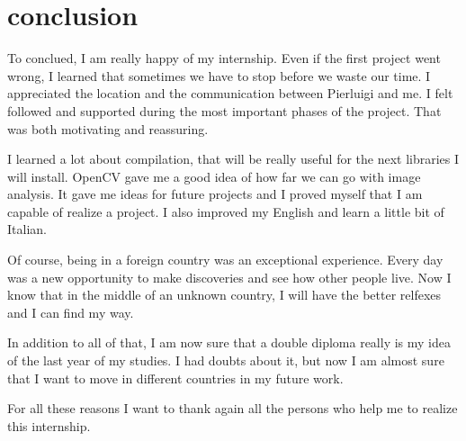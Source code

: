 \chapter{conclusion}

\par To conclued, I am really happy of my internship. Even if the first project went wrong, I learned that sometimes we have to stop before we waste our time. I appreciated the location and the communication between Pierluigi and me. I felt followed and supported during the most important phases of the project. That was both motivating and reassuring.
\par I learned a lot about compilation, that will be really useful for the next libraries I will install. OpenCV gave me a good idea of how far we can go with image analysis. It gave me ideas for future projects and I proved myself that I am capable of realize a project. I also improved my English and learn a little bit of Italian. 
\par Of course, being in a foreign country was an exceptional experience. Every day was a new opportunity to make discoveries and see how other people live. Now I know that in the middle of an unknown country, I will have the better relfexes and I can find my way.
\par In addition to all of that, I am now sure that a double diploma really is my idea of the last year of my studies. I had doubts about it, but now I am almost sure that I want to move in different countries in my future work.
\par For all these reasons I want to thank again all the persons who help me to realize this internship.